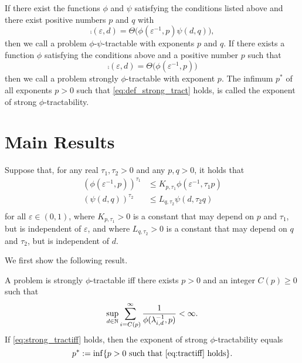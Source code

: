 \documentclass[11pt,a4paper]{article}
\begin{document}
\begin{definition}
If there exist the functions $\phi$ and $\psi$ satisfying the conditions listed above and there exist positive numbers $p$ and $q$ with
\[
\comp(\varepsilon, d)  = \Theta\bigl(\phi(\varepsilon^{-1},p) \psi(d,q) \bigr),
\]
then we call a problem $\phi$-$\psi$-tractable with exponents $p$ and $q$.  
If there exists a function $\phi$ satisfying the conditions above and a positive number $p$ such that 
\begin{equation}\label{eq:def_strong_tract}
\comp(\varepsilon, d)  = \Theta\bigl(\phi(\varepsilon^{-1},p) \bigr)
\end{equation}
then we call a problem strongly $\phi$-tractable with exponent $p$. The infimum $p^*$ of all exponents $p>0$ such that \eqref{eq:def_strong_tract} holds, 
is called the exponent of strong $\phi$-tractability. 
\end{definition}


\section{Main Results}
Suppose that, for any real $\tau_1, \tau_2>0$ and any $p,q>0$, it holds that
\begin{align*}
 (\phi(\varepsilon^{-1},p))^{\tau_1} &\le K_{p,\tau_1} \phi (\varepsilon^{-1},\tau_1 p)\\
  (\psi(d,q))^{\tau_2} &\le L_{q,\tau_2} \psi (d,\tau_2 q)\\
\end{align*}
for all $\varepsilon\in (0,1)$, where $K_{p,\tau_1}>0$ is a constant that may depend on $p$ and $\tau_1$, but is independent of $\varepsilon$, 
and where $L_{q,\tau_2}>0$ is a constant that may depend on $q$ and $\tau_2$, but is independent of $d$.

We first show the following result. 
\begin{theorem}\label{thm_main_strong_tract} 
A problem is strongly $\phi$-tractable iff there exists $p>0$ and an integer $C(p)\ge 0$ such that
\begin{equation} \label{eq:strong_tractiff}
     \sup_{d \in \mathbb{N}} \sum_{i = C(p)}^\infty \frac{1}{\phi(\lambda_{i, d}^{-1},p)} < \infty.
\end{equation}
If \eqref{eq:strong_tractiff} holds, then the exponent of strong $\phi$-tractability equals
\[
 p^* := \inf\{p>0\ \mbox{such that \eqref{eq:tractiff} holds}\}.
\]

\end{theorem}
\end{document}
